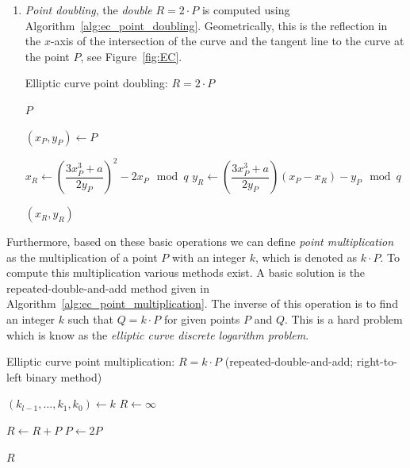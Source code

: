\begin{enumerate}
  \item \emph{Point doubling}, the \emph{double} $R = 2 \cdot P$ is computed
    using Algorithm~\ref{alg:ec_point_doubling}. Geometrically, this is the
    reflection in the $x$-axis of the intersection of the curve and the tangent
    line to the curve at the point $P$, see Figure~\ref{fig:EC}.
    \begin{algorithm}
      \caption{Elliptic curve point doubling: $R = 2 \cdot P$}
      \label{alg:ec_point_doubling}

      \begin{algorithmic}[1]
            \Return $P$
          \EndIf

          \State $(x_P, y_P) \gets P$

          \State $x_R \gets \left(\dfrac{3 x_P^3 + a}{2 y_P}\right)^2 - 2 x_P \mod q$
          \State $y_R \gets \left(\dfrac{3 x_P^3 + a}{2 y_P}\right) (x_P - x_R) - y_P \mod q$

          \Return $(x_R, y_R)$
        \EndFunction
      \end{algorithmic}
    \end{algorithm}
\end{enumerate}

Furthermore, based on these basic operations we can define \emph{point
multiplication} as the multiplication of a point $P$ with an integer $k$, which
is denoted as $k \cdot P$. To compute this multiplication various methods exist.
A basic solution is the repeated-double-and-add method given in
Algorithm~\ref{alg:ec_point_multiplication}. The inverse of this operation is to
find an integer $k$ such that $Q = k \cdot P$ for given points $P$ and $Q$. This
is a hard problem which is know as the \emph{elliptic curve discrete logarithm
problem}.

\begin{algorithm}
  \caption{Elliptic curve point multiplication: $R = k \cdot P$ (repeated-double-and-add; right-to-left binary method)}
  \label{alg:ec_point_multiplication}

  \begin{algorithmic}[1]
      \State $(k_{l-1}, \dots, k_1, k_0) \gets k$ 
      \State $R \gets \infty$

          \State $R \gets R + P$
        \EndIf
        \State $P \gets 2P$
      \EndFor

      \Return $R$
    \EndFunction
  \end{algorithmic}
\end{algorithm}

